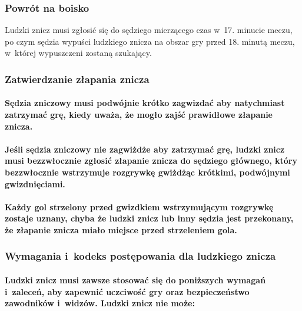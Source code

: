 \documentclass[12pt,a4paper]{article}
\begin{document}
\subsubsection{Powrót na boisko}

Ludzki znicz musi zgłosić się do sędziego mierzącego czas w~17. minucie
meczu, po czym sędzia wypuści ludzkiego znicza na obszar gry przed 18.
minutą meczu, w~której wypuszczeni zostaną szukający.

\subsubsection{Zatwierdzanie złapania znicza}

\paragraph{Sędzia zniczowy musi podwójnie krótko zagwizdać aby
	natychmiast zatrzymać grę, kiedy uważa, że mogło zajść prawidłowe
	złapanie znicza.}

\paragraph{Jeśli sędzia zniczowy nie zagwiżdże aby zatrzymać grę,
	ludzki znicz musi bezzwłocznie zgłosić złapanie znicza do sędziego
	głównego, który bezzwłocznie wstrzymuje rozgrywkę gwiżdżąc krótkimi,
	podwójnymi gwizdnięciami.}

\paragraph{Każdy gol strzelony przed gwizdkiem wstrzymującym
	rozgrywkę zostaje uznany, chyba że ludzki znicz lub inny sędzia jest
	przekonany, że złapanie znicza miało miejsce przed strzeleniem gola.}

\subsubsection{Wymagania i~kodeks postępowania dla ludzkiego znicza}

\paragraph{Ludzki znicz musi zawsze stosować się do poniższych
	wymagań i~zaleceń, aby zapewnić uczciwość gry oraz bezpieczeństwo
	zawodników i~widzów. Ludzki znicz nie może:}
\end{document}
